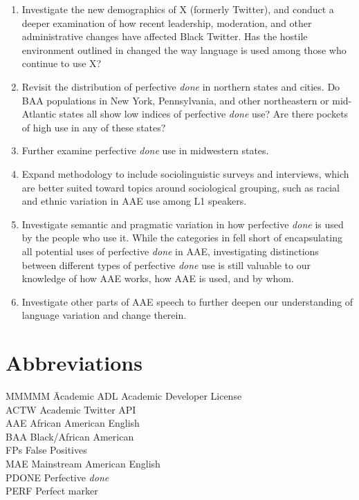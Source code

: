 \documentclass[output=paper,draftmode,colorlinks,citecolor=brown]{langscibook}
\begin{document}
\begin{enumerate}
\item Investigate the new demographics of X (formerly Twitter), and conduct a deeper examination of how recent leadership, moderation, and other administrative changes have affected Black Twitter. Has the hostile environment outlined in \citet{Dwoskin2023} changed the way language is used among those who continue to use X?

\item Revisit the distribution of perfective \textit{done} in northern states and cities. Do BAA populations in New York, Pennsylvania, and other northeastern or mid-Atlantic states all show low indices of perfective \textit{done} use? Are there pockets of high use in any of these states?

\item Further examine perfective \textit{done} use in midwestern states.

\item Expand methodology to include sociolinguistic surveys and interviews, which are better suited toward topics around sociological grouping, such as racial and ethnic variation in AAE use among L1 speakers.

\item Investigate semantic and pragmatic variation in how perfective \textit{done} is used by the people who use it. While the categories in \citet{Comrie1976} fell short of encapsulating all potential uses of perfective \textit{done} in AAE, investigating distinctions between different types of perfective \textit{done} use is still valuable to our knowledge of how AAE works, how AAE is used, and by whom.

\item Investigate other parts of AAE speech to further deepen our understanding of language variation and change therein. 
\end{enumerate}

\section*{Abbreviations}

\begin{tabbing}
MMMMM \= Academic\kill
ADL   \> Academic Developer License  \\
ACTW  \> Academic Twitter API        \\
AAE   \> African American English    \\
BAA   \> Black/African American      \\
FPs   \> False Positives             \\
MAE   \> Mainstream American English \\
PDONE \> Perfective \textit{done}    \\
PERF  \> Perfect marker              
\end{tabbing}

\printbibliography[heading=subbibliography,notkeyword=this]
\end{document}
